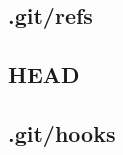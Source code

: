 
\clearpage


\clearpage

\subsection*{.git/refs}
\clearpage


\clearpage


\clearpage

\subsection*{HEAD}
\clearpage

\subsection*{.git/hooks}
